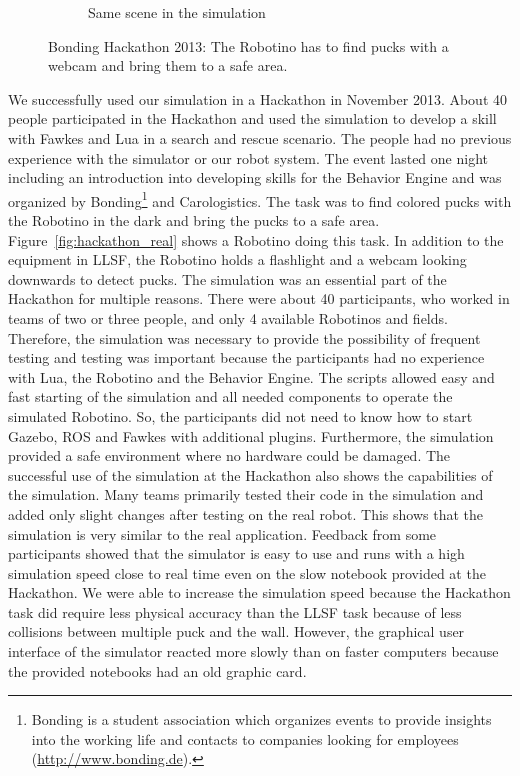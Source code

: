 \begin{figure}
\begin{subfigure}[b]{0.47\textwidth}
    \caption{Same scene in the simulation\\}
    \label{fig:hackathon_sim}
  \end{subfigure}
  \caption{Bonding Hackathon 2013: The Robotino has to find pucks with a webcam and bring them to a safe area.}
  \label{fig:hackathon}
\end{figure}
We successfully used our simulation in a Hackathon in November 2013. About 40 people participated in the Hackathon and used the simulation to develop a skill with Fawkes and Lua in a search and rescue scenario. The people had no previous experience with the simulator or our robot system. The event lasted one night including an introduction into developing skills for the Behavior Engine and was organized by Bonding\footnote{Bonding is a student association which organizes events to provide insights into the working life and contacts to companies looking for employees (\url{http://www.bonding.de}).} and Carologistics. The task was to find colored pucks with the Robotino in the dark and bring the pucks to a safe area. Figure~\ref{fig:hackathon_real} shows a Robotino doing this task. In addition to the equipment in LLSF, the Robotino holds a flashlight and a webcam looking downwards to detect pucks. The simulation was an essential part of the Hackathon for multiple reasons. There were about 40 participants, who worked in teams of two or three people, and only 4 available Robotinos and fields. Therefore, the simulation was necessary to provide the possibility of frequent testing and testing was important because the participants had no experience with Lua, the Robotino and the Behavior Engine. The scripts allowed easy and fast starting of the simulation and all needed components to operate the simulated Robotino. So, the participants did not need to know how to start Gazebo, ROS and Fawkes with additional plugins. Furthermore, the simulation provided a safe environment where no hardware could be damaged. The successful use of the simulation at the Hackathon also shows the capabilities of the simulation. Many teams primarily tested their code in the simulation and added only slight changes after testing on the real robot. This shows that the simulation is very similar to the real application. Feedback from some participants showed that the simulator is easy to use and runs with a high simulation speed close to real time even on the slow notebook provided at the Hackathon. We were able to increase the simulation speed because the Hackathon task did require less physical accuracy than the LLSF task because of less collisions between multiple puck and the wall. However, the graphical user interface of the simulator reacted more slowly than on faster computers because the provided notebooks had an old graphic card.\\
